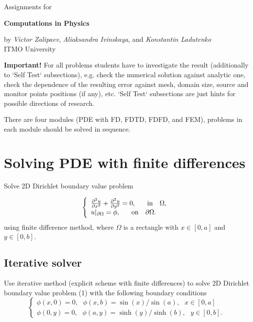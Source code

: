 \documentclass[11pt]{article}
\newcommand{\be}{\begin{equation}}
\newcommand{\ee}{\end{equation}}
\def \be {\begin{equation}}
\def \ee {\end{equation}}
\begin{document}
\thispagestyle{empty}
\begin{center}
		Assignments for

	\Huge	\textbf{Computations in Physics}
\end{center}
\begin{center}
  by \textit{Victor Zalipaev}, \textit{Aliaksandra Ivinskaya},
  and \textit{Konstantin Ladutenko}\\
  ITMO University
\end{center}

\textbf{Important!} For all problems students have to investigate the result (additionally to `Self Test` subsections), e.g. check the numerical solution against analytic one, check the dependence of the resulting error against mesh, domain size, source and monitor points positions (if any), etc. `Self Test` subsections are just hints for possible directions of research.

There are four modules (PDE with FD, FDTD, FDFD, and FEM), problems in each module should be solved in sequence.

\section{Solving PDE with finite differences}

Solve 2D Dirichlet boundary value problem

 \be
\left \{\begin{array}{ll}\frac{\partial^2u}{\partial
x^2}+\frac{\partial^2u}{\partial
y^2}=0,~~~~~{\rm in}~~~ \Omega,\\
u|_{\partial\Omega}=\phi,~~~~~{\rm on}~~~\partial\Omega.
\end{array} \right. \label{dp}
 \ee
using finite difference method, where $\Omega$ is a rectangle with
$x\in[0,a]$ and $y\in[0,b]$.

\subsection{Iterative solver}
\label{sec:iterative-solver}

Use iterative method (explicit scheme with finite differences) to solve 2D
Dirichlet boundary value problem (1) with the following boundary
conditions
 \be
 \left \{\begin{array}{ll}
\phi(x,0)=0,~~~\phi(x,b)=\sin(x)/\sin(a),~~~x\in[0,a] \\

\phi(0,y)=0,~~~\phi(a,y)=\sinh(y)/\sinh(b),~~~y\in[0,b].
 \end{array} \right. \label{bc}
 \ee
\end{document}
